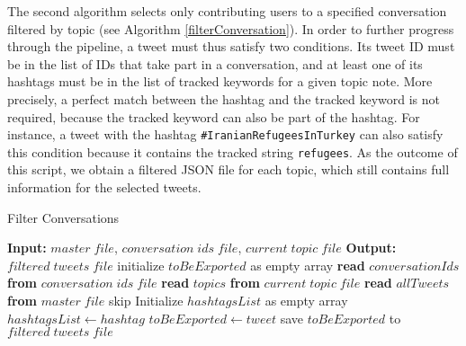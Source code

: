 The second algorithm selects only contributing users to a specified conversation filtered by topic (see Algorithm \vref{filterConversation}).  In order to further progress through the pipeline, a tweet must thus satisfy two conditions. Its tweet ID must be in the list of IDs that take part in a conversation, and at least one of its hashtags must be in the list of tracked keywords for a given topic note. More precisely, a perfect match between the hashtag and the tracked keyword is not required, because the tracked keyword can also be part of the hashtag. For instance, a tweet with the hashtag \texttt{\#IranianRefugeesInTurkey} can also satisfy this condition because it contains the tracked string \texttt{refugees}. As the outcome of this script, we obtain a filtered JSON file for each topic, which still contains full information for the selected tweets.
\begin{algorithm}
  \caption{Filter Conversations}\label{filterConversation}
  \begin{algorithmic}[1]
  \State \textbf{Input:} $master\;file$, $conversation\;ids\;file$, $current\;topic\;file$
  \State \textbf{Output:} $filtered\;tweets\;file$
  \State initialize $toBeExported$ as empty array
  \State \textbf{read} $conversationIds$ \textbf{from} $conversation\;ids\;file$
  \State \textbf{read} $topics$ \textbf{from} $current\;topic\;file$
  \State \textbf{read} $allTweets$ \textbf{from} $master\;file$
      \State skip
    \EndIf
    \State Initialize $hashtagsList$ as empty array
        \State $hashtagsList\gets hashtag$
      \EndFor
    \EndIf
            \State $toBeExported\gets tweet$
          \EndIf
        \EndFor
      \EndFor
    \EndIf
  \EndFor
  \State save $toBeExported$ to $filtered\;tweets\;file$
  \end{algorithmic}
\end{algorithm}

